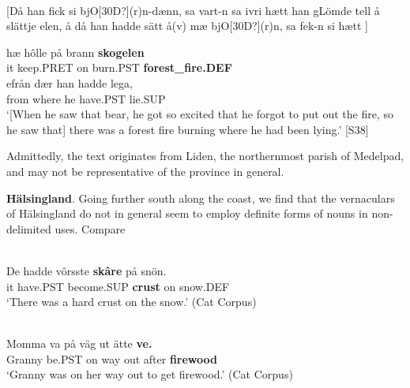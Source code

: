 





\ea\label{}
\\
{}[Då han fick si bjO[30D?](r)n{}-dænn, sa vart-n sa ivri hætt han gLömde tell å slättje elen, å då han hadde sätt å(v) mæ bjO[30D?](r)n, sa fek-n si hætt ]

\gll 	hæ  hôlle  på  brann  \textbf{skogelen}\\
		it  keep.PRET  on  burn.PST  \textbf{forest\_fire.DEF}\\
\gll 	efrån  dær  han  hadde  lega,\\
		from  where  he   have.PST  lie.SUP\\
\glt  	‘[When he saw that bear, he got so excited that he forgot to put out the fire, so he saw that] there was a forest fire burning where he had been lying.’ [S38]

\z

Admittedly, the text originates from Liden, the northernmost parish of Medelpad, and may not be representative of the province in general. 


\textbf{Hälsingland}. Going further south along the coast, we find that the vernaculars of Hälsingland do not in general seem to employ definite forms of nouns in non-delimited uses. Compare 


\ea \label{} 
\\
\gll De  hadde  vôrsste  \textbf{skâre} på  snön.\\
it  have.PST  become.SUP  \textbf{crust} on  snow.DEF\\
\glt ‘There was a hard crust on the snow.’ (Cat Corpus)

\z

\ea \label{} 
\\
\gll Momma  va  på  väg  ut  ätte  \textbf{ve.}\\
Granny  be.PST  on  way  out  after  \textbf{firewood}\\
\glt ‘Granny was on her way out to get firewood.’ (Cat Corpus)

